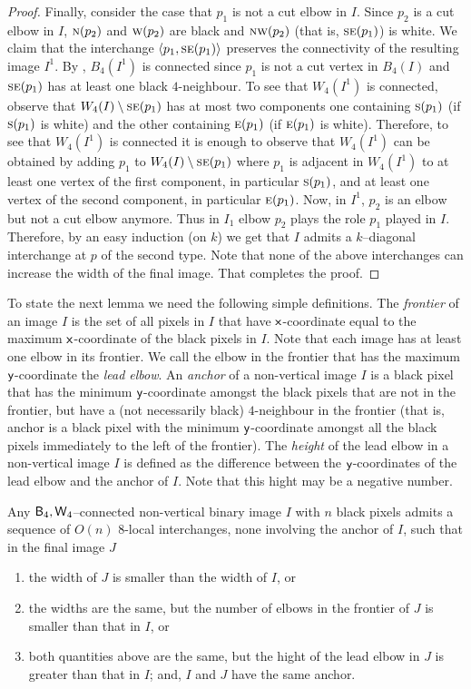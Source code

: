 \documentclass[lotsofwhite,charterfonts]{patmorin}
\newcommand{\fourfour}{\ensuremath{\protect\textup{\textsf{B}}_{4},\protect\textup{\textsf{W}}_{4}}}
\newcommand{\N}{\textsc{n}}
\newcommand{\E}{\textsc{e}}
\newcommand{\SE}{\textsc{se}}
\renewcommand{\S}{\textsc{s}}
\newcommand{\W}{\textsc{w}}
\newcommand{\NW}{\textsc{nw}}
\newcommand{\x}{\ensuremath{\protect\textup{\textsf{x}}}}
\newcommand{\y}{\ensuremath{\protect\textup{\textsf{y}}}}
\newcommand{\ic}[2]{\langle #1,#2 \rangle}
\newcommand{\sm}{\ensuremath{\setminus}}
\begin{document}
\begin{proof}
Finally, consider the case that $p_1$ is not a cut elbow in $I$. Since
$p_2$ is a cut elbow in $I$, $\N(p_2)$ and $\W(p_2)$ are black and
$\NW(p_2)$ (that is, $\SE(p_1)$) is white. We claim that the
interchange $\ic{p_1}{\SE(p_1)}$ preserves the connectivity of the
resulting image $I^1$. By , $B_4(I^1)$ is connected
since $p_1$ is not a cut vertex in $B_4(I)$ and $\SE(p_1)$ has at
least one black $4$-neighbour. To see that $W_4(I^1)$ is connected,
observe that $W_4(I)\sm \SE(p_1)$ has at most two components one
containing $\S(p_1)$ (if $\S(p_1)$ is white) and the other containing
$\E(p_1)$ (if $\E(p_1)$ is white). Therefore, to see that $W_4(I^1)$
is connected it is enough to observe that $W_4(I^1)$ can be obtained
by adding $p_1$ to $W_4(I)\sm \SE(p_1)$ where $p_1$ is adjacent in
$W_4(I^1)$ to at least one vertex of the first component, in
particular $\S(p_1)$, and at least one vertex of the second component,
in particular $\E(p_1)$. Now, in $I^1$, $p_2$ is an elbow but not a
cut elbow anymore. Thus in $I_1$ elbow $p_2$ plays the role $p_1$
played in $I$. Therefore, by an easy induction (on $k$) we get that
$I$ admits a $k$--diagonal interchange at $p$ of the second type. Note
that none of the above interchanges can increase the width of the
final image. That completes the proof.  
\end{proof}

To state the next lemma we need the following simple definitions.  The \emph{frontier} of an image $I$ is the set of all pixels in $I$ that have \x-coordinate equal to the maximum \x-coordinate of the black pixels in $I$. Note that each image has at least one elbow in its frontier. We call the elbow in the frontier that has the maximum \y-coordinate the \emph{lead elbow}. An \emph{anchor} of a non-vertical image $I$ is a black pixel that has the minimum \y-coordinate amongst the black pixels that are not in the frontier, but have a (not necessarily black) $4$-neighbour in the frontier (that is, anchor is a black pixel with the minimum \y-coordinate amongst all the black pixels immediately to the left of the frontier). The \emph{height} of the lead elbow in a non-vertical image $I$ is defined as the difference between the \y-coordinates of the lead elbow and the anchor of $I$. Note that this hight may be a negative number.


\begin{lem}
Any \fourfour--connected non-vertical binary image $I$ with $n$ black pixels admits a sequence of $O(n)$ 8-local interchanges, none involving the anchor of $I$, such that in the final image $J$

\begin{enumerate}
\item the width of $J$ is smaller than the width of $I$, or 
\item the widths are the same, but the number of elbows in the frontier of $J$ is smaller than that in $I$, or
\item both quantities above are the same, but the hight of the lead elbow in $J$ is greater than that in $I$; and, $I$ and $J$ have the same anchor.
\end{enumerate}
\end{lem}
\end{document}
